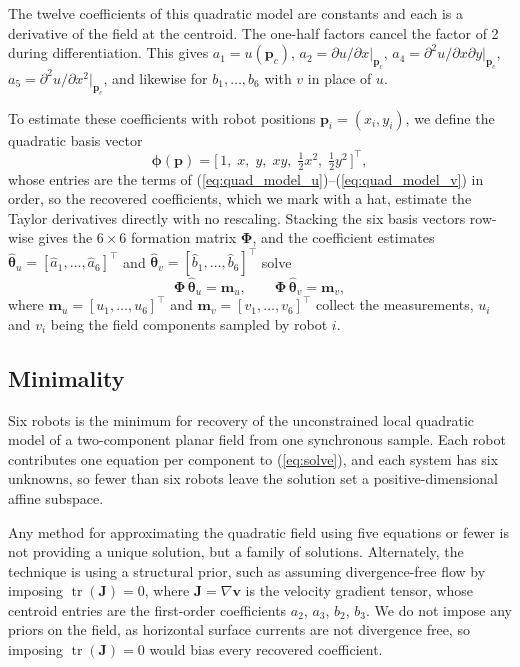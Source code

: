 \documentclass[lettersize,journal]{IEEEtran}
\begin{document}
The twelve coefficients of this quadratic model are constants and each is a derivative of the field at
the centroid. The one-half factors cancel the factor of 2 during differentiation.
This gives $a_1 = u(\mathbf{p}_c)$, $a_2 = \partial u/\partial
x|_{\mathbf{p}_c}$, $a_4 = \partial^2 u/\partial x \partial
y|_{\mathbf{p}_c}$, $a_5 = \partial^2 u/\partial x^2|_{\mathbf{p}_c}$,
and likewise for $b_1, \ldots, b_6$ with $v$ in place of $u$.

To estimate these coefficients with robot positions $\mathbf{p}_i = (x_i,
y_i)$, we define the quadratic basis vector
\begin{equation}
    \boldsymbol{\phi}(\mathbf{p}) =
    \bigl[\,1, \; x, \; y, \; xy, \;
    \tfrac{1}{2}x^2, \; \tfrac{1}{2}y^2\,\bigr]^\top,
\end{equation}
whose entries are the terms of
(\ref{eq:quad_model_u})--(\ref{eq:quad_model_v}) in order, so
the recovered coefficients, which we mark with a hat, estimate the Taylor derivatives directly with
no rescaling. Stacking the six basis vectors row-wise gives
the $6 \times 6$ formation matrix $\boldsymbol{\Phi}$, and the coefficient
estimates $\hat{\boldsymbol{\theta}}_u = [\hat{a}_1, \ldots,
\hat{a}_6]^\top$ and $\hat{\boldsymbol{\theta}}_v = [\hat{b}_1, \ldots,
\hat{b}_6]^\top$ solve
\begin{equation}
    \boldsymbol{\Phi}\,\hat{\boldsymbol{\theta}}_u = \mathbf{m}_u, \qquad
    \boldsymbol{\Phi}\,\hat{\boldsymbol{\theta}}_v = \mathbf{m}_v,
    \label{eq:solve}
\end{equation}
where $\mathbf{m}_u = [u_1, \ldots, u_6]^\top$ and
$\mathbf{m}_v = [v_1, \ldots, v_6]^\top$ collect the measurements, $u_i$
and $v_i$ being the field components sampled by robot $i$. 

\subsection{Minimality}
\label{sec:minimality}

Six robots is the minimum for recovery of the unconstrained local
quadratic model of a two-component planar field from one synchronous
sample. Each robot contributes one equation per component to
(\ref{eq:solve}), and each system has six unknowns, so fewer than six
robots leave the solution set a positive-dimensional affine subspace.

Any method for approximating the quadratic field using five equations or
fewer is not providing a unique solution, but a family of solutions.
Alternately, the technique is using a structural prior, such as assuming
divergence-free flow by imposing $\operatorname{tr}(\mathbf{J}) = 0$, where
$\mathbf{J} = \nabla\mathbf{v}$ is the velocity gradient tensor, whose
centroid entries are the first-order coefficients $a_2$, $a_3$, $b_2$,
$b_3$. We do not impose any priors on the field, as horizontal surface
currents are not divergence free, so imposing
$\operatorname{tr}(\mathbf{J}) = 0$ would bias every recovered coefficient.
\end{document}
